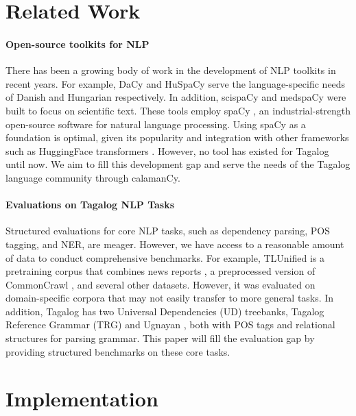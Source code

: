 \documentclass[11pt]{article}
\begin{document}



\section{Related Work}

\paragraph*{Open-source toolkits for NLP}
There has been a growing body of work in the development of NLP toolkits in recent years.
For example, DaCy \citep{Enevoldsen2021DaCyAU} and HuSpaCy \citep{Orosz2022HuSpaCyAI} serve the language-specific needs of Danish and Hungarian respectively.
In addition, scispaCy \citep{Neumann2019ScispaCyFA} and medspaCy \citep{Eyre2021LaunchingIC} were built to focus on scientific text.
These tools employ spaCy \citep{Honnibal2020Spacy}, an industrial-strength open-source software for natural language processing.
Using spaCy as a foundation is optimal, given its popularity and integration with other frameworks such as HuggingFace transformers \citep{Wolf2019HuggingFacesTS}.
However, no tool has existed for Tagalog until now.
We aim to fill this development gap and serve the needs of the Tagalog language community through calamanCy.

\paragraph*{Evaluations on Tagalog NLP Tasks} 
Structured evaluations for core NLP tasks, such as dependency parsing, POS tagging, and NER, are meager.
However, we have access to a reasonable amount of data to conduct comprehensive benchmarks.
For example, TLUnified \citep{Cruz2021ImprovingLL} is a pretraining corpus that combines news reports \citep{Cruz2020ExploitingNA}, a preprocessed version of CommonCrawl \citep{OrtizSuarez2019AsynchronousPF}, and several other datasets.
However, it was evaluated on domain-specific corpora that may not easily transfer to more general tasks.
In addition, Tagalog has two Universal Dependencies (UD) treebanks, Tagalog Reference Grammar (TRG) \citep{Samson2018TRG} and Ugnayan \citep{Aquino2020ParsingIT}, both with POS tags and relational structures for parsing grammar.
This paper will fill the evaluation gap by providing structured benchmarks on these core tasks.

\section{Implementation}
\end{document}
